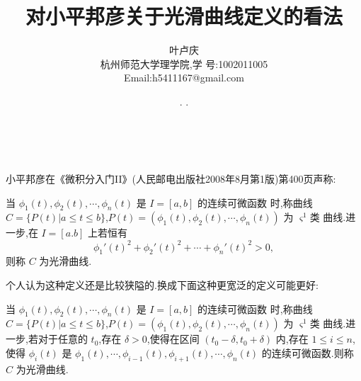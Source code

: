 \documentclass[a4paper, 12pt]{article} %
\makeatletter
\renewcommand{\maketitle}{ %
  \renewcommand\refname{参考文献}
  \newcommand{\D}{\displaystyle}\newcommand{\ri}{\Rightarrow}
  \newcommand{\ds}{\displaystyle} \renewcommand{\ni}{\noindent}
  \newcommand{\pa}{\partial} \newcommand{\Om}{\Omega}
  \newcommand{\om}{\omega} \newcommand{\sik}{\sum_{i=1}^k}
  \newcommand{\vov}{\Vert\omega\Vert} \newcommand{\Umy}{U_{\mu_i,y^i}}
  \newcommand{\lamns}{\lambda_n^{^{\scriptstyle\sigma}}}
  \newcommand{\chiomn}{\chi_{_{\Omega_n}}}
  \newcommand{\ullim}{\underline{\lim}} \newcommand{\bsy}{\boldsymbol}
  \newcommand{\mvb}{\mathversion{bold}} \newcommand{\la}{\lambda}
  \newcommand{\La}{\Lambda} \newcommand{\va}{\varepsilon}
  \newcommand{\be}{\beta} \newcommand{\al}{\alpha}
  \newcommand{\dis}{\displaystyle} \newcommand{\R}{{\mathbb R}}
  \newcommand{\N}{{\mathbb N}} \newcommand{\cF}{{\mathcal F}}
  \newcommand{\gB}{{\mathfrak B}} \newcommand{\eps}{\epsilon}
  \begin{flushright} %
    {\LARGE\@title} %
    
    \vspace{50pt} %
    
    {\large\@author} %
    \\\@date %
    
    \vspace{40pt} %
  \end{flushright}
}
\makeatother
\begin{document}
\title{\textbf{对小平邦彦关于光滑曲线定义的看法}}
\author{\small{叶卢庆}\\{\small{杭州师范大学理学院,学
      号:1002011005}}\\{\small{Email:h5411167@gmail.com}}} %
\renewcommand{\today}{\number\year. \number\month. \number\day}
\date{\today} %
  
  
  
\maketitle %
  
  
  
  
  
  
  
小平邦彦在《微积分入门II》(人民邮电出版社2008年8月第1版)第400页声称:
\begin{shaded}
当 $\phi_1(t),\phi_2(t),\cdots,\phi_n(t)$ 是 $I=[a,b]$ 的连续可微函数
  时,称曲线 $C=\{P(t)|a\leq t\leq
  b\}$,$P(t)=(\phi_1(t),\phi_2(t),\cdots,\phi_n(t))$ 为 $\varsigma^1$类
  曲线.进一步,在 $I=[a.b]$ 上若恒有
$$
\phi_1'(t)^2+\phi_2'(t)^2+\cdots+\phi_n'(t)^2>0,
$$
则称 $C$ 为光滑曲线.
\end{shaded}
个人认为这种定义还是比较狭隘的.换成下面这种更宽泛的定义可能更好:
\begin{shaded}
当 $\phi_1(t),\phi_2(t),\cdots,\phi_n(t)$ 是 $I=[a,b]$ 的连续可微函数
  时,称曲线 $C=\{P(t)|a\leq t\leq
  b\}$,$P(t)=(\phi_1(t),\phi_2(t),\cdots,\phi_n(t))$ 为 $\varsigma^1$类
  曲线.进一步,若对于任意的 $t_0$,存在 $\delta>0$,使得在区间
  $(t_0-\delta,t_0+\delta)$ 内,存在 $1\leq i\leq n$,使得 $\phi_i(t)$
  是 $\phi_1(t),\cdots,\phi_{i-1}(t),\phi_{i+1}(t),\cdots,\phi_n(t)$
  的连续可微函数.则称 $C$ 为光滑曲线.
\end{shaded}
\end{document}
